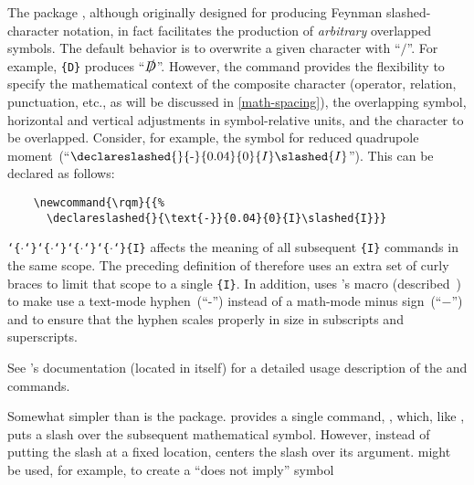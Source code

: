  
The  package \citep{slashed}, although originally designed for
producing Feynman
slashed-character notation, in fact
facilitates the production of \emph{arbitrary} overlapped symbols.
\ifhaveslashed
  \newcommand{\rqm}{{\declareslashed{}{\text{-}}{0.04}{0}{I}\slashed{I}}}
  The default behavior is to overwrite a given character with ``$/$''.
  For example, \cmd{\slashed}\verb|{D}| produces ``$\slashed{D}$''.
  However, the \cmd{\declareslashed} command provides the flexibility
  to specify the mathematical context of the composite character
  (operator, relation, punctuation, etc., as will be discussed in
  \ref{math-spacing}), the overlapping symbol, horizontal and
  vertical adjustments in symbol-relative units, and the character to
  be overlapped.  Consider, for example, the symbol for reduced
  quadrupole moment~(``$\rqm$'').  This can be declared as follows:

\begin{verbatim}
    \newcommand{\rqm}{{%
      \declareslashed{}{\text{-}}{0.04}{0}{I}\slashed{I}}}
\end{verbatim}

  \noindent
  \newcommand{\curlyarg}{\texttt{\char`\{}$\cdot$\texttt{\char`\}}}%

  \cmd{\declareslashed}\curlyarg\curlyarg\curlyarg\curlyarg\verb|{I}|
  affects the meaning of all subsequent \cmd{\slashed}\verb|{I}|
  commands in the same scope.  The preceding definition of \cmdX{\rqm}
  therefore uses an extra set of curly braces to limit that scope to a
  single \cmd{\slashed}\verb|{I}|.  In addition, \cmdX{\rqm} uses
  's \cmd{\text} macro
  (described~) to make
  \cmd{\declareslashed} use a text-mode hyphen~(``-'') instead of a
  math-mode minus sign~(``$-$'') and to ensure that the hyphen scales
  properly in size in subscripts and superscripts.
\fi  

See 's documentation (located in
 itself) for a detailed usage description of the
\cmd{\slashed} and \cmd{\declareslashed} commands.

Somewhat simpler than  is the 
package.   provides a single command,
\cmd{\centernot}, which, like \cmd{\not}, puts a slash over the
subsequent mathematical symbol.  However, instead of putting the slash
at a fixed location, \cmd{\centernot} centers the slash over its
argument.  \cmd{\centernot} might be used, for example, to create a
``does not imply'' symbol%

